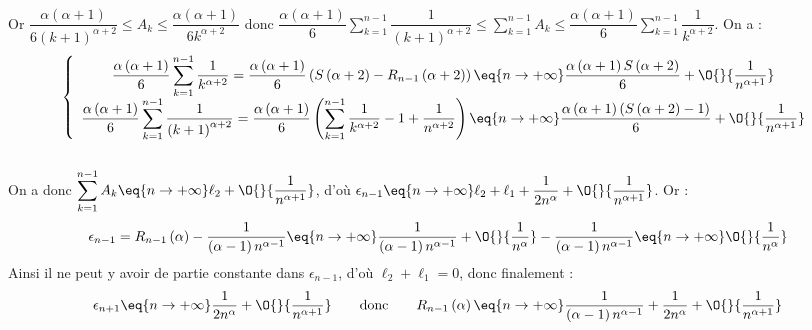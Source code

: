 \documentclass[a4paper,french,bookmarks]{article}
\begin{document}
\begin{enumerate}[resume]
{\begin{align*}
            \end{align*}
            \text{}\\[10pt]
            Or $\dfrac{\alpha\left(\alpha + 1\right)}{6\left(k+1\right)^{\alpha +2}} \leq A_k \leq \dfrac{\alpha\left(\alpha + 1\right)}{6k^{\alpha +2}}$ donc $\displaystyle  \dfrac{\alpha\left(\alpha +1\right)}{6}\sum_{k=1}^{n-1} \dfrac{1}{\left(k+1\right)^{\alpha +2}} \leq \sum_{k=1}^{n-1} A_k \leq \dfrac{\alpha\left(\alpha +1\right)}{6}\sum_{k=1}^{n-1} \dfrac{1}{k^{\alpha +2}}$. On a :
            \[ \left\lbrace\begin{array}{c}
                \displaystyle\dfrac{\alpha\left(\alpha +1\right)}{6}\sum_{k=1}^{n-1} \dfrac{1}{k^{\alpha +2}} = \dfrac{\alpha\left(\alpha +1\right)}{6}\left(S\left(\alpha + 2\right) - R_{n-1}\left(\alpha + 2\right)\right) \eq{n \to +\infty} \dfrac{\alpha\left(\alpha + 1\right)S\left(\alpha + 2\right)}{6} + \O{}{\dfrac{1}{n^{\alpha + 1}}}\\
                \displaystyle \dfrac{\alpha\left(\alpha +1\right)}{6}\sum_{k=1}^{n-1} \dfrac{1}{\left(k+1\right)^{\alpha +2}} = \dfrac{\alpha\left(\alpha +1\right)}{6}\left(\sum_{k=1}^{n-1} \dfrac{1}{k^{\alpha + 2}} - 1 + \dfrac{1}{n^{\alpha + 2}}\right) \eq{n \to +\infty} \dfrac{\alpha\left(\alpha + 1\right)\left(S\left(\alpha + 2\right) - 1\right)}{6} + \O{}{\dfrac{1}{n^{\alpha + 1}}}
                \end{array}\right. \]
            \text{}\\[10pt]
            On a donc $\displaystyle \sum_{k=1}^{n-1} A_k \eq{n \to +\infty} \ell_2 + \O{}{\dfrac{1}{n^{\alpha + 1}}}$, d'où $\epsilon_{n-1} \eq{n \to +\infty} \ell_2 + \ell_1 + \dfrac{1}{2n^\alpha} + \O{}{\dfrac{1}{n^{\alpha + 1}}}$. Or :
            \[ \epsilon_{n-1} = R_{n-1}\left(\alpha\right) - \dfrac{1}{\left(\alpha -1\right)n^{\alpha - 1}} \eq{n \to +\infty} \dfrac{1}{\left(\alpha -1\right)n^{\alpha - 1}} + \O{}{\dfrac{1}{n^{\alpha}}} - \dfrac{1}{\left(\alpha -1\right)n^{\alpha - 1}} \eq{n \to +\infty} \O{}{\dfrac{1}{n^\alpha}}\]
            Ainsi il ne peut y avoir de partie constante dans $\epsilon_{n-1}$, d'où $\ell_2 + \ell_1 = 0$, donc finalement :
            \[ \epsilon_{n+1} \eq{n \to +\infty} \dfrac{1}{2n^\alpha} + \O{}{\dfrac{1}{n^{\alpha + 1}}} \qquad\text{donc}\qquad R_{n-1}\left(\alpha\right) \eq{n \to +\infty} \dfrac{1}{\left(\alpha - 1\right)n^{\alpha - 1}} +
        \dfrac{1}{2n^\alpha} + \O{}{\dfrac{1}{n^{\alpha + 1}}}\]
        }
    \end{enumerate}
    
\end{document}
